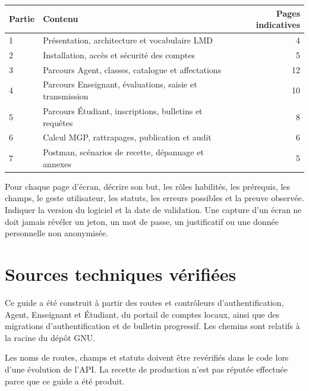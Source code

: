 \documentclass[10pt,a4paper]{article}
\begin{document}
\begin{center}
\begin{tabularx}{0.9\linewidth}{lXr}
\toprule
Partie & Contenu & Pages indicatives \\
\midrule
1 & Présentation, architecture et vocabulaire LMD & 4 \\
2 & Installation, accès et sécurité des comptes & 5 \\
3 & Parcours Agent, classes, catalogue et affectations & 12 \\
4 & Parcours Enseignant, évaluations, saisie et transmission & 10 \\
5 & Parcours Étudiant, inscriptions, bulletins et requêtes & 8 \\
6 & Calcul MGP, rattrapages, publication et audit & 6 \\
7 & Postman, scénarios de recette, dépannage et annexes & 5 \\
\bottomrule
\end{tabularx}
\end{center}

Pour chaque page d’écran, décrire son but, les rôles habilités, les prérequis, les champs, le geste utilisateur, les statuts, les erreurs possibles et la preuve observée. Indiquer la version du logiciel et la date de validation. Une capture d’un écran ne doit jamais révéler un jeton, un mot de passe, un justificatif ou une donnée personnelle non anonymisée.

\section{Sources techniques vérifiées}

Ce guide a été construit à partir des routes et contrôleurs d’authentification, Agent, Enseignant et Étudiant, du portail de comptes locaux, ainsi que des migrations d’authentification et de bulletin progressif. Les chemins sont relatifs à la racine du dépôt GNU.

Les noms de routes, champs et statuts doivent être revérifiés dans le code lors d’une évolution de l’API. La recette de production n’est pas réputée effectuée parce que ce guide a été produit.
\end{document}
